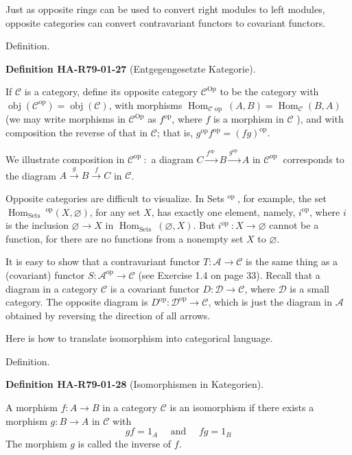 \documentclass[10pt, letterpaper]{article}
\newcommand{\CustomHeading}[3]{%
  \par\medskip\noindent%
  \textbf{#1 #2} \textnormal{(#3)}.\enskip%
}
\newenvironment{DEF}[2]{\begin{unitbox}\CustomHeading{Definition}{#1}{#2}}{\end{unitbox}}
\begin{document}
Just as opposite rings can be used to convert right modules to left modules, opposite categories can convert contravariant functors to covariant functors.

Definition. 

\begin{DEF}{HA-R79-01-27}{Entgegengesetzte Kategorie}
If $\mathcal{C}$ is a category, define its opposite category $\mathcal{C}^{\mathrm{Op}}$ to be the category with $\operatorname{obj}\left(\mathcal{C}^{\mathrm{op}}\right)=\operatorname{obj}(\mathcal{C})$, with morphisms $\operatorname{Hom}_{\mathcal{C} \text { op }}(A, B)=\operatorname{Hom}_{\mathcal{C}}(B, A)$ (we may write morphisms in $\mathcal{C}^{\mathrm{Op}}$ as $f^{\mathrm{op}}$, where $f$ is a morphism in $\mathcal{C}$ ), and with composition the reverse of that in $\mathcal{C}$; that is, $g^{\mathrm{op}} f^{\mathrm{op}}=(f g)^{\mathrm{op}}$.
\end{DEF}

We illustrate composition in $\mathcal{C}^{\text {op }}:$ a diagram $C \xrightarrow{f^{\text {op }}} B \xrightarrow{g^{\text {op }}} A$ in $\mathcal{C}^{\text {op }}$ corresponds to the diagram $A \xrightarrow{g} B \xrightarrow{f} C$ in $\mathcal{C}$.

Opposite categories are difficult to visualize. In Sets ${ }^{\text {op }}$, for example, the set $\operatorname{Hom}_{\text {Sets }}{ }^{\mathrm{op}}(X, \varnothing)$, for any set $X$, has exactly one element, namely, $i^{\mathrm{op}}$, where $i$ is the inclusion $\varnothing \rightarrow X$ in $\operatorname{Hom}_{\text {Sets }}(\varnothing, X)$. But $i^{\text {op }}: X \rightarrow \varnothing$ cannot be a function, for there are no functions from a nonempty set $X$ to $\varnothing$.

It is easy to show that a contravariant functor $T: \mathcal{A} \rightarrow \mathcal{C}$ is the same thing as a (covariant) functor $S: \mathcal{A}^{\mathrm{op}} \rightarrow \mathcal{C}$ (see Exercise 1.4 on page 33). Recall that a diagram in a category $\mathcal{C}$ is a covariant functor $D: \mathcal{D} \rightarrow \mathcal{C}$, where $\mathcal{D}$ is a small category. The opposite diagram is $D^{\mathrm{op}}: \mathcal{D}^{\mathrm{op}} \rightarrow \mathcal{C}$, which is just the diagram in $\mathcal{A}$ obtained by reversing the direction of all arrows.

Here is how to translate isomorphism into categorical language.

Definition. 


\begin{DEF}{HA-R79-01-28}{Isomorphismen in Kategorien}
A morphism $f: A \rightarrow B$ in a category $\mathcal{C}$ is an isomorphism if there exists a morphism $g: B \rightarrow A$ in $\mathcal{C}$ with
$$
g f=1_{A} \quad \text { and } \quad f g=1_{B}
$$
The morphism $g$ is called the inverse of $f$.
\end{DEF}
\end{document}
